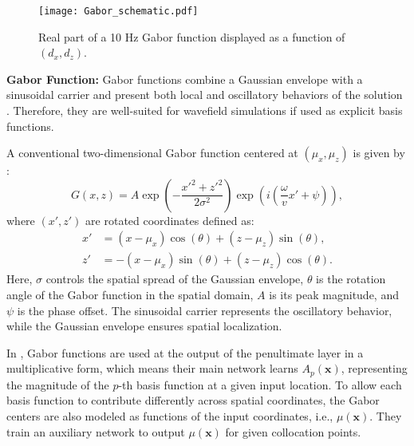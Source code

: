 \documentclass[authoryear, preprint, 12pt]{elsarticle}
\begin{document}
	\begin{figure}[ht]
	\centering
	\texttt{[image: Gabor\_schematic.pdf]}
	\caption{Real part of a 10 Hz Gabor function displayed as a function of \( (d_x, d_z) \). }
	\label{fig:Gabor_schematic}
\end{figure}
	
	\textbf{Gabor Function:} Gabor functions combine a Gaussian envelope with a sinusoidal carrier and present both local and oscillatory behaviors of the solution \citep{pinto2014}. Therefore, they are well-suited for wavefield simulations if used as explicit basis functions. 
	
	
	A conventional two-dimensional Gabor function centered at \( (\mu_x, \mu_z) \) is given by \citep{gabor1946}:
	\begin{equation}
		G(x, z) = A \exp \left( -\frac{x'^2 + z'^2}{2\sigma^2} \right) 
		\exp \left( i \left( \frac{\omega}{v} x' + \psi \right) \right),
	\end{equation}
	where \( (x', z') \) are rotated coordinates defined as:
	\begin{align}
		x' &= (x - \mu_x) \cos(\theta) + (z - \mu_z) \sin(\theta), \\
		z' &= -(x - \mu_x) \sin(\theta) + (z - \mu_z) \cos(\theta).
	\end{align}
	Here, \( \sigma \) controls the spatial spread of the Gaussian envelope, \( \theta \) is the rotation angle of the Gabor function in the spatial domain, \( A \) is its peak magnitude, and \( \psi \) is the phase offset. The sinusoidal carrier represents the oscillatory behavior, while the Gaussian envelope ensures spatial localization.  

	
	In \cite{Alkhalifah2024}, Gabor functions are used at the output of the penultimate layer in a multiplicative form, which means their main network learns \( A_p(\mathbf{x}) \), representing the magnitude of the \( p \)-th basis function at a given input location. To allow each basis function to contribute differently across spatial coordinates, the Gabor centers are also modeled as functions of the input coordinates, i.e., \( \mu(\mathbf{x}) \). They train an auxiliary network to output \( \mu(\mathbf{x}) \) for given collocation points.  
	
\end{document}
